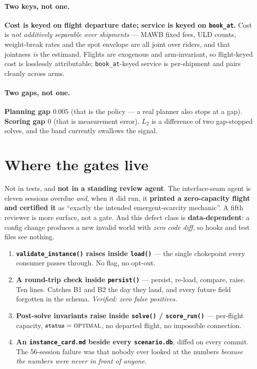 \documentclass[11pt,a4paper]{article}
\newcommand{\src}[1]{\texttt{\small #1}}
\begin{document}
\paragraph{Two keys, not one.}
\textbf{Cost is keyed on flight departure date; service is keyed on \src{book\_at}.} Cost is
\emph{not additively separable over shipments} --- MAWB fixed fees, ULD counts, weight-break rates and the
spot envelope are all joint over riders, and that jointness \emph{is} the estimand. Flights are exogenous
and arm-invariant, so flight-keyed cost is losslessly attributable; \src{book\_at}-keyed service is
per-shipment and pairs cleanly across arms.

\paragraph{Two gaps, not one.}
\textbf{Planning gap $0.005$} (that is the policy --- a real planner also stops at a gap).
\textbf{Scoring gap $0$} (that is measurement error). $L_2$ is a difference of two gap-stopped solves, and
the band currently swallows the signal.

\section{Where the gates live}

Not in tests, and \textbf{not in a standing review agent}. The interface-seam agent is eleven sessions
overdue \emph{and}, when it did run, it \textbf{printed a zero-capacity flight and certified it} as
``exactly the intended emergent-scarcity mechanic''. A fifth reviewer is more surface, not a gate. And this
defect class is \textbf{data-dependent}: a config change produces a new invalid world with \emph{zero code
diff}, so hooks and test files see nothing.

\begin{enumerate}[leftmargin=*,itemsep=2pt]
  \item \textbf{\src{validate\_instance()} raises inside \src{load()}} --- the single chokepoint every
        consumer passes through. No flag, no opt-out.
  \item \textbf{A round-trip check inside \src{persist()}} --- persist, re-load, compare, raise. Ten lines.
        Catches B1 and B2 the day they land, and every future field forgotten in the schema.
        \emph{Verified: zero false positives.}
  \item \textbf{Post-solve invariants raise inside \src{solve()} / \src{score\_run()}} --- per-flight
        capacity, $\src{status} = \textsc{optimal}$, no departed flight, no impossible connection.
  \item \textbf{An \src{instance\_card.md} beside every \src{scenario.db}}, diffed on every commit. The
        56-session failure was that nobody ever looked at the numbers \emph{because the numbers were never
        in front of anyone}.
\end{enumerate}
\end{document}
